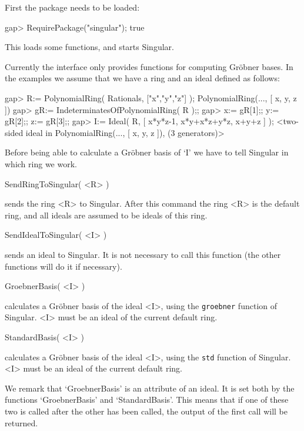 


First the package needs to be loaded:

\begintt
gap> RequirePackage("singular");
true
\endtt

This loads some {\GAP} functions, and starts {\sf Singular}.

Currently the interface only provides functions for computing Gr\"{o}bner 
bases. In the examples we assume that we have a ring and an ideal
defined as follows:

\beginexample
gap> R:= PolynomialRing( Rationals, ["x","y","z"] );
PolynomialRing(..., [ x, y, z ])
gap> gR:= IndeterminatesOfPolynomialRing( R );;
gap> x:= gR[1];; y:= gR[2];; z:= gR[3];;
gap> I:= Ideal( R, [ x*y*z-1, x*y+x*z+y*z, x+y+z ] );
<two-sided ideal in PolynomialRing(..., [ x, y, z ]), (3 generators)>
\endexample

Before being able to calculate a Gr\"{o}bner basis of `I' we have
to tell Singular in which ring we work.


\>SendRingToSingular( <R> )

sends the ring <R> to {\sf Singular}. After this command the ring <R>
is the default ring, and all ideals are assumed to be ideals of this
ring.

\>SendIdealToSingular( <I> )

sends an ideal to {\sf Singular}. It is not necessary to call this function
(the other functions will do it if necessary).

\>GroebnerBasis( <I> )

calculates a Gr\"{o}bner basis of the ideal <I>, using the {\tt groebner}
function of {\sf Singular}. <I> must be an ideal of the current default ring.


\>StandardBasis( <I> ) 

calculates a Gr\"{o}bner basis of the ideal <I>, using the {\tt std}
function of {\sf Singular}. <I> must be an ideal of the current default ring.


We remark that `GroebnerBasis' is an attribute of an ideal. It is set both
by the functions `GroebnerBasis' and `StandardBasis'. This means that
if one of these two is called after the other has been called, the output
of the first call will be returned.

